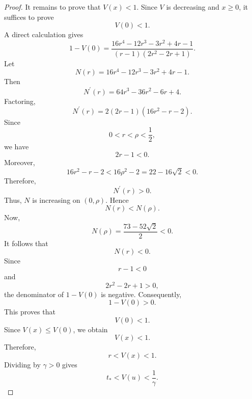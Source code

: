 \documentclass[11pt,a4paper]{article}
\numberwithin{equation}{section}
\numberwithin{table}{section}
\theoremstyle{plain}
\theoremstyle{definition}\newtheorem{definition}[theorem]{Definition}
\theoremstyle{remark}\newtheorem{remark}[theorem]{Remark}
\begin{document}
\begin{proof}
It remains to prove that $V(x)<1$. Since $V$ is decreasing and $x\geq0$,
it suffices to prove 
\begin{equation*}
V(0)<1.
\end{equation*}
A direct calculation gives 
\begin{equation*}
1-V(0)=\frac{16r^4-12r^3-3r^2+4r-1}{(r-1)(2r^2-2r+1)}.
\end{equation*}
Let 
\begin{equation*}
N(r)=16r^4-12r^3-3r^2+4r-1.
\end{equation*}
Then 
\begin{equation*}
N^{\prime}(r)=64r^3-36r^2-6r+4.
\end{equation*}
Factoring, 
\begin{equation*}
N^{\prime}(r)=2(2r-1)(16r^2-r-2).
\end{equation*}
Since 
\begin{equation*}
0<r<\rho<\frac12,
\end{equation*}
we have 
\begin{equation*}
2r-1<0.
\end{equation*}
Moreover, 
\begin{equation*}
16r^2-r-2<16\rho^2-2=22-16\sqrt2<0.
\end{equation*}
Therefore, 
\begin{equation*}
N^{\prime}(r)>0.
\end{equation*}
Thus, $N$ is increasing on $(0,\rho)$. Hence 
\begin{equation*}
N(r)<N(\rho).
\end{equation*}
Now, 
\begin{equation*}
N(\rho)=\frac{73-52\sqrt2}{2}<0.
\end{equation*}
It follows that 
\begin{equation*}
N(r)<0.
\end{equation*}
Since 
\begin{equation*}
r-1<0
\end{equation*}
and 
\begin{equation*}
2r^2-2r+1>0,
\end{equation*}
the denominator of $1-V(0)$ is negative. Consequently, 
\begin{equation*}
1-V(0)>0.
\end{equation*}
This proves that 
\begin{equation*}
V(0)<1.
\end{equation*}
Since $V(x)\leq V(0)$, we obtain 
\begin{equation*}
V(x)<1.
\end{equation*}
Therefore, 
\begin{equation*}
r<V(x)<1.
\end{equation*}
Dividing by $\gamma>0$ gives 
\begin{equation*}
t_*<V(u)<\frac1\gamma.
\end{equation*}
\end{proof}
\end{document}
